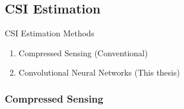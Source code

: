 \documentclass{beamer}
\begin{document}

  \subsection{CSI Estimation}

    \begin{frame}{CSI Estimation Methods}
       \begin{enumerate}
       \item Compressed Sensing (Conventional)
       \item Convolutional Neural Networks (This thesis)
      \end{enumerate} 
    \end{frame}

  \subsubsection{Compressed Sensing}
\end{document}
